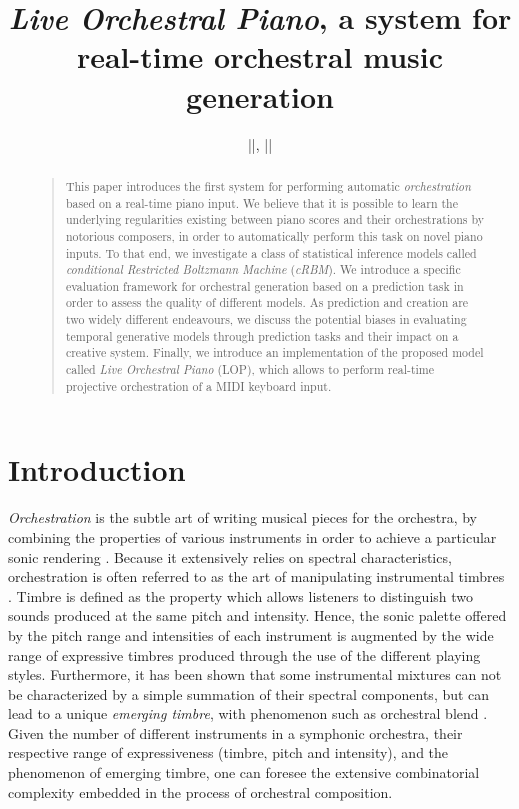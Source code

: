 \documentclass[letterpaper]{article}
\title{\textit{Live Orchestral Piano}, a system for real-time orchestral music generation}
\author{||, ||\\}
\begin{document}
 
\maketitle
\begin{abstract}
\begin{quote}
This paper introduces the first system for performing automatic \textit{orchestration} based on a real-time piano input. We believe that it is possible to learn the underlying regularities existing between piano scores and their orchestrations by notorious composers, in order to automatically perform this task on novel piano inputs. To that end, we investigate a class of statistical inference models called \textit{conditional Restricted Boltzmann Machine} (\textit{cRBM}). We introduce a specific evaluation framework for orchestral generation based on a prediction task in order to assess the quality of different models. As prediction and creation are two widely different endeavours, we discuss the potential biases in evaluating temporal generative models through prediction tasks and their impact on a creative system. Finally, we introduce an implementation of the proposed model called \textit{Live Orchestral Piano} (LOP), which allows to perform real-time projective orchestration of a MIDI keyboard input.
\end{quote}
\end{abstract}

\section{Introduction}
\textit{Orchestration} is the subtle art of writing musical pieces for the orchestra, by combining the properties of various instruments in order to achieve a particular sonic rendering \cite{koechli_orch,Rimsky-Korsakov:1873aa}. Because it extensively relies on spectral characteristics, orchestration is often referred to as the art of manipulating instrumental timbres \cite{mcadams2013timbre}. Timbre is defined as the property which allows listeners to distinguish two sounds produced at the same pitch and intensity.
Hence, the sonic palette offered by the pitch range and intensities of each instrument is augmented by the wide range of expressive timbres produced through the use of the different playing styles.
Furthermore, it has been shown that some instrumental mixtures can not be characterized by a simple summation of their spectral components, but can lead to a unique \textit{emerging timbre}, with phenomenon such as orchestral blend \cite{tardieu2012perception}.
Given the number of different instruments in a symphonic orchestra, their respective range of expressiveness (timbre, pitch and intensity), and the phenomenon of emerging timbre, one can foresee the extensive combinatorial complexity embedded in the process of orchestral composition.
\end{document}
